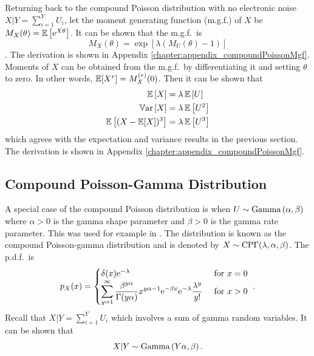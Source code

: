 Returning back to the compound Poisson distribution with no electronic noise $X|Y = \sum_{i=1}^{Y}U_i$, let the moment generating function (m.g.f.) of $X$ be $M_X(\theta)=\operatorname{\mathbb{E}}\left[\mathrm{e}^{X\theta}\right]$. It can be shown that the m.g.f.~is
\begin{equation}
  M_X(\theta)=
  \exp\left[
    \lambda
    \left(
      M_U(\theta)-1
    \right)
  \right]
\end{equation}
\citep{gatto2010saddlepoint}. The derivation is shown in Appendix \ref{chapter:appendix_compoundPoissonMgf}. Moments of $X$ can be obtained from the m.g.f.~by differentiating it and setting $\theta$ to zero. In other words, $\operatorname{\mathbb{E}}[X^r]=M_X^{(r)}(0)$. Then it can be shown that
\begin{align}
  \operatorname{\mathbb{E}}\left[X\right]&=\lambda\operatorname{\mathbb{E}}\left[U\right]
  \\
  \operatorname{\mathbb{V}ar}\left[X\right] &= \lambda\operatorname{\mathbb{E}}\left[U^2\right]
  \\
  \operatorname{\mathbb{E}}\left[(X-\operatorname{\mathbb{E}}[X])^3\right] &=\lambda\operatorname{\mathbb{E}}\left[U^3\right]
\end{align}
which agrees with the expectation and variance results in the previous section. The derivation is shown in Appendix \ref{chapter:appendix_compoundPoissonMgf}.

\subsection{Compound Poisson-Gamma Distribution}
\label{chapter:compoundPoisson_compoundPoissonGamma}
A special case of the compound Poisson distribution is when $U\sim\operatorname{Gamma}\left(\alpha,\beta\right)$ where $\alpha>0$ is the gamma shape parameter and $\beta>0$ is the gamma rate parameter. This was used for example in \cite{xu2009electronic}. The distribution is known as the compound Poisson-gamma distribution and is denoted by $X\sim\operatorname{CP\Gamma}(\lambda,\alpha,\beta)$. The p.d.f.~is
\begin{equation}
  p_X(x) = 
  \begin{cases}
    \delta(x) \mathrm{e}^{-\lambda} & \text{ for } x=0 \\ 
    \displaystyle\sum_{y=1}^{\infty}\dfrac{\beta^{y\alpha}}{\Gamma(y\alpha)}x^{y\alpha-1}\mathrm{e}^{-\beta x}\mathrm{e}^{-\lambda}\frac{\lambda^y}{y!} & \text{ for } x>0
  \end{cases}
  \ .
  \label{eq:compoundPoisson_pdf}
\end{equation}
Recall that $X|Y=\sum_{i=1}^YU_i$ which involves a sum of gamma random variables. It can be shown that
\begin{equation}
  X|Y\sim\operatorname{Gamma}\left(Y\alpha,\beta\right).
\end{equation}

